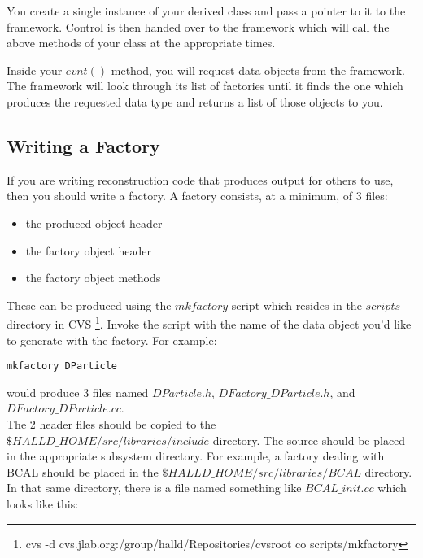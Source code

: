 \documentclass[12pt]{article}
\begin{document}
You create a single instance of your derived class and pass a pointer
to it to the framework. Control is then
handed over to the framework which will call the above methods of your
class at the appropriate times.

Inside your $evnt()$ method, you will request data objects from the 
framework. The framework will look through its list of factories
until it finds the one which produces the requested data type and returns
a list of those objects to you.

\subsection{Writing a Factory}
\label{factory}
If you are writing reconstruction code that produces output for others
to use, then you should write a factory. A factory consists, at a
minimum, of 3 files:

\begin{itemize}
	\item{the produced object header}
	\item{the factory object header}
	\item{the factory object methods}
\end{itemize}
These can be produced using the $mkfactory$ script which resides in
the $scripts$ directory in CVS
\footnote{cvs -d cvs.jlab.org:/group/halld/Repositories/cvsroot co scripts/mkfactory}.
Invoke the script with the name of the data object you'd like to
generate with the factory. For example:

\begin{lstlisting}[frame=shadowbox,backgroundcolor=\color{cmdbkgd}]
mkfactory DParticle
\end{lstlisting}

would produce 3 files named $DParticle.h$, $DFactory\_DParticle.h$,
and $DFactory\_DParticle.cc$.\\

The 2 header files should be copied to the $\$HALLD\_HOME/src/libraries/include$
directory. The source should be placed in the appropriate subsystem
directory. For example, a factory dealing with BCAL should be placed
in the $\$HALLD\_HOME/src/libraries/BCAL$ directory. In that same
directory, there is a file named something like $BCAL\_init.cc$
which looks like this:


\end{document}
